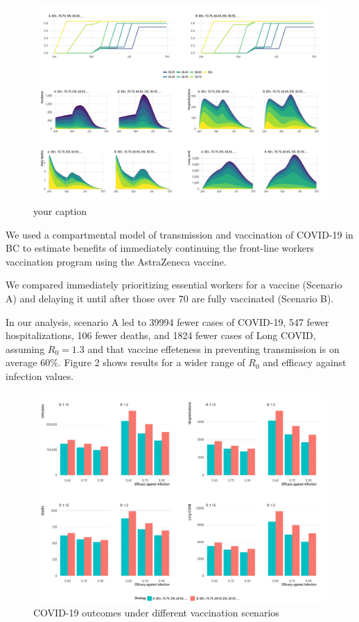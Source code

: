 \documentclass[]{interact}
\theoremstyle{plain}%
\theoremstyle{definition}
\theoremstyle{remark}
\begin{document}
\begin{figure}

{\centering \includegraphics[width=1\linewidth]{./fig-trajectoriesFull} 

}

\caption{your caption}\label{fig:fig1}
\end{figure}

We used a compartmental model of transmission and vaccination of
COVID-19 in BC to estimate benefits of immediately continuing the
front-line workers vaccination program using the AstraZeneca vaccine.

We compared immediately prioritizing essential workers for a vaccine
(Scenario A) and delaying it until after those over 70 are fully
vaccinated (Scenario B).

In our analysis, scenario A led to 39994 fewer cases of COVID-19, 547
fewer hospitalizations, 106 fewer deaths, and 1824 fewer cases of Long
COVID, assuming \(R_0=1.3\) and that vaccine effeteness in preventing
transmission is on average 60\%. Figure 2 shows results for a wider
range of \(R_0\) and efficacy against infection values.

\begin{figure}

{\centering \includegraphics[width=1\linewidth]{./fig-barplots} 

}

\caption{COVID-19 outcomes under different vaccination scenarios}\label{fig:fig2}
\end{figure}
\end{document}
